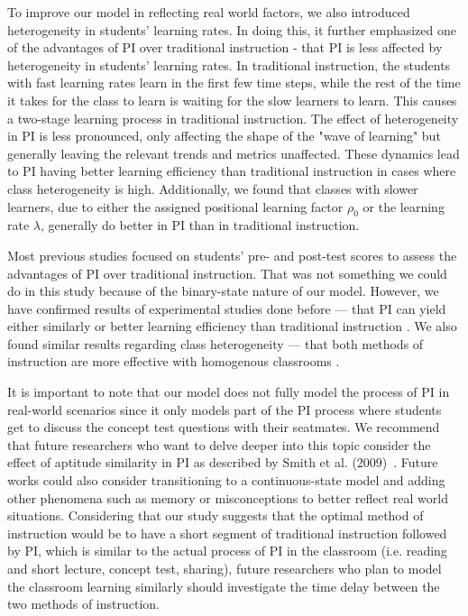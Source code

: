 To improve our model in reflecting real world factors, we also introduced heterogeneity in students' learning rates.
In doing this, it further emphasized one of the advantages of PI over traditional instruction - that PI is less affected by heterogeneity in students' learning rates.
In traditional instruction, the students with fast learning rates learn in the first few time steps, while the rest of the time it takes for the class to learn is waiting for the slow learners to learn.
This causes a two-stage learning process in traditional instruction.
The effect of heterogeneity in PI is less pronounced, only affecting the shape of the "wave of learning" but generally leaving the relevant trends and metrics unaffected.
These dynamics lead to PI having better learning efficiency than traditional instruction in cases where class heterogeneity is high.
Additionally, we found that classes with slower learners, due to either the assigned positional learning factor $\rho_0$ or the learning rate $\lambda$, generally do better in PI than in traditional instruction.

Most previous studies focused on students' pre- and post-test scores to assess the advantages of PI over traditional instruction. 
That was not something we could do in this study because of the binary-state nature of our model.
However, we have confirmed results of experimental studies done before --- that PI can yield either similarly or better learning efficiency than traditional instruction \cite{crouch2001peer,lasry2008peer,thacker1994comparing,smith2009peer}.
We also found similar results regarding class heterogeneity --- that both methods of instruction are more effective with homogenous classrooms \cite{roxas2010seating}.

It is important to note that our model does not fully model the process of PI in real-world scenarios since it only models part of the PI process where students get to discuss the concept test questions with their seatmates.
We recommend that future researchers who want to delve deeper into this topic consider the effect of aptitude similarity in PI as described by Smith et al. (2009)~\cite{smith2009peer}.
Future works could also consider transitioning to a continuous-state model and adding other phenomena such as memory or misconceptions to better reflect real world situations.
Considering that our study suggests that the optimal method of instruction would be to have a short segment of traditional instruction followed by PI, which is similar to the actual process of PI in the classroom (i.e. reading and short lecture, concept test, sharing), future researchers who plan to model the classroom learning similarly should investigate the time delay between the two methods of instruction.